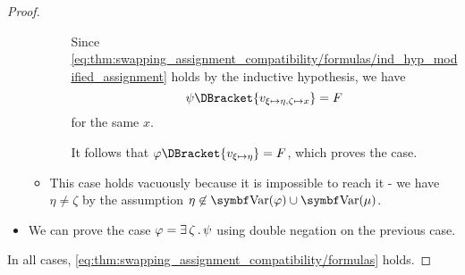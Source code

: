 \begin{proof}
\begin{itemize}
\begin{itemize}
\begin{itemize}
        Since \eqref{eq:thm:swapping_assignment_compatibility/formulas/ind_hyp_modified_assignment} holds by the inductive hypothesis, we have
        \begin{equation*}
          \psi\DBracket{v_{\xi \mapsto \eta, \zeta \mapsto x}} = F
        \end{equation*}
        for the same \( x \).

        It follows that \( \varphi\DBracket{v_{\xi \mapsto \eta}} = F \), which proves the case.
      \end{itemize}

      \item This case holds vacuously because it is impossible to reach it - we have \( \eta \neq \zeta \) by the assumption \( \eta \not\in \Bold{Var}(\varphi) \cup \Bold{Var}(\mu) \).
    \end{itemize}

    \item We can prove the case \( \varphi = \exists \, \zeta \, . \, \psi \) using double negation on the previous case.
  \end{itemize}

  In all cases, \eqref{eq:thm:swapping_assignment_compatibility/formulas} holds.
\end{proof}

